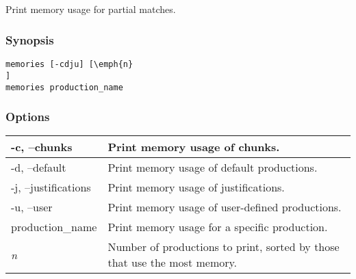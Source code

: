 \subsection{}
\label{memories}
Print memory usage for partial matches. 
\subsubsection*{Synopsis}
\begin{verbatim}
memories [-cdju] [\emph{n}
]
memories production_name 
\end{verbatim}
\subsubsection*{Options}
\begin{tabular}{|l|l|}
\hline 
 -c, --chunks  & Print memory usage of chunks.  \\
 \hline 
 -d, --default  & Print memory usage of default productions.  \\
 \hline 
 -j, --justifications  & Print memory usage of justifications.  \\
 \hline 
 -u, --user  & Print memory usage of user-defined productions.  \\
 \hline 
production\_name & Print memory usage for a specific production.  \\
 \hline 
\emph{n}
 & Number of productions to print, sorted by those that use the most memory.  \\
 \hline 
\end{tabular}
